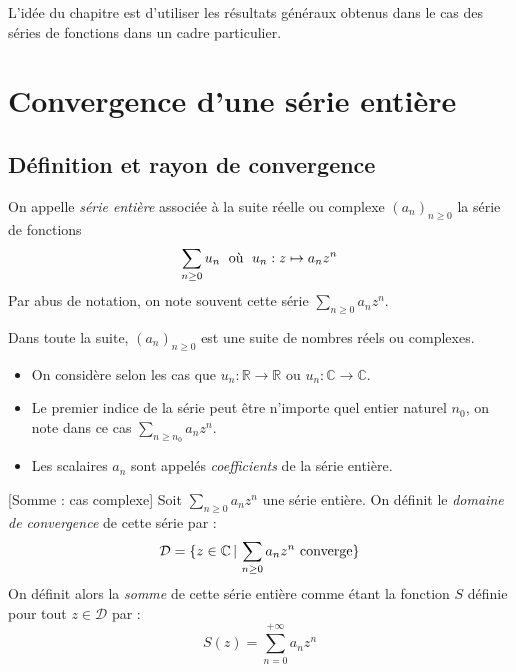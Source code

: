 \documentclass[french,11pt,twoside]{VcCours}
\begin{document}

\tableofcontents
\separationTitre

L'idée du chapitre est d'utiliser les résultats généraux obtenus dans le cas des séries de fonctions dans un cadre particulier.

\medskip

\section{Convergence d'une série entière}
\subsection{Définition et rayon de convergence}

\begin{Definition}{} On appelle \emph{série entière} associée à la suite réelle ou complexe $(a_n)_{n \geq 0}$ la série de fonctions 
$$\sum_{n \geq 0} u_n \; \hbox{ où } \; u_n : z \mapsto a_n z^n$$
Par abus de notation, on note souvent cette série $\sum_{n \geq 0} a_n z^n$.
\end{Definition}



Dans toute la suite, $(a_n)_{n \geq 0}$ est une suite de nombres réels ou complexes.

\medskip

\begin{Remarques}{}
\begin{itemize} 
\item On considère selon les cas que $u_n : \mathbb{R} \rightarrow \mathbb{R}$ ou $u_n : \mathbb{C} \rightarrow \mathbb{C}$.
\item Le premier indice de la série peut être n'importe quel entier naturel $n_0$, on note dans ce cas $\sum_{n \geq n_0} a_n z^n$.
\item Les scalaires $a_n$ sont appelés \emph{coefficients} de la série entière.
 \end{itemize}
\end{Remarques}
 
 \begin{Definition}{}[Somme : cas complexe] Soit $\sum_{n \geq 0} a_n z^n$ une série entière. On définit le \emph{domaine de convergence} de cette série par :
 $$ \mathcal{D} = \lbrace z \in \mathbb{C} \, \vert \,  \sum_{n \geq 0} a_n z^n \hbox{ converge} \rbrace$$
 On définit alors la \emph{somme} de cette série entière comme étant la fonction $S$ définie pour tout $z \in \mathcal{D}$ par :
 $$ S(z) = \sum_{n=0}^{+ \infty} a_n z^n$$
 \end{Definition}
 
\end{document}

